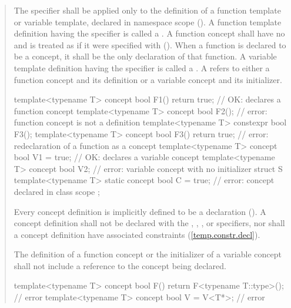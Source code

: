 \begin{quote}

\pnum
The  specifier shall be applied only to the 
definition of a function template or variable template, declared
in namespace scope ().
%
A function template definition having the 
specifier is called a . 
% 
A function concept shall have no  
and is treated as if it were specified with  
().
%
When a function is declared to be a concept, it shall be the only
declaration of that function.
%
A variable template definition having the  
specifier is called a .
%
A  refers to either a function concept 
and its definition or a variable concept and its initializer.
%
\enterexample
\begin{codeblock}
template<typename T> 
  concept bool F1() { return true; } // OK: declares a function concept
template<typename T> 
  concept bool F2();                 // error: function concept is not a definition
template<typename T> 
  constexpr bool F3();
template<typename T>
  concept bool F3() { return true; } // error: redeclaration of a function as a concept
template<typename T> 
  concept bool V1 = true;            // OK: declares a variable concept
template<typename T> 
  concept bool V2;                   // error: variable concept with no initializer
struct S {
  template<typename T> 
    static concept bool C = true;    // error: concept declared in class scope
};
\end{codeblock}
\exitexample

\pnum
Every concept definition is implicitly defined to be a 
 declaration ().
% 
A concept definition shall not be declared with the 
, , , or 
 specifiers, nor shall a concept definition have associated 
constraints (\ref{temp.constr.decl}).

\pnum
The definition of a function concept or the initializer of
a variable concept shall not include a reference to the concept being
declared.
%
\enterexample
\begin{codeblock}
template<typename T>
  concept bool F() { return F<typename T::type>(); } // error
template<typename T>
  concept bool V = V<T*>;                            // error
\end{codeblock}
\exitexample


\end{quote}
